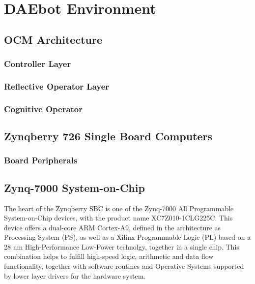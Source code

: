 

\chapter{DAEbot Environment}

\section{OCM Architecture}

\subsection{Controller Layer}

\subsection{Reflective Operator Layer}

\subsection{Cognitive Operator}

\section{Zynqberry 726 Single Board Computers}

\subsection{Board Peripherals}

\section{Zynq-7000 System-on-Chip}

The heart of the Zynqberry SBC is one of the Zynq-7000 All Programmable System-on-Chip devices, with the product name XC7Z010-1CLG225C. This device offers a dual-core ARM Cortex-A9, defined in the architecture as Processing System (PS), as well as a Xilinx Programmable Logic (PL) based on a 28 nm High-Performance Low-Power technolgy, together in a single chip. This combination helps to fulfill high-speed logic, arithmetic and data flow functionality, together with software routines and Operative Systems supported by lower layer drivers for the hardware system.

